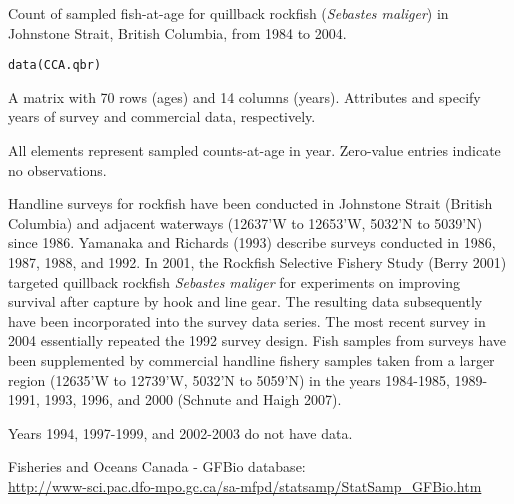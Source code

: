 \documentclass[letterpaper]{book}
\begin{document}
\begin{Description}\relax
Count of sampled fish-at-age for quillback rockfish 
(\emph{Sebastes maliger}) in Johnstone Strait, British Columbia, 
from 1984 to 2004.
\end{Description}
\begin{Usage}
\begin{verbatim}data(CCA.qbr)\end{verbatim}
\end{Usage}
\begin{Format}\relax
A matrix with 70 rows (ages) and 14 columns 
(years). Attributes  and  
specify years of survey and commercial data, respectively.


All elements represent sampled counts-at-age in year. Zero-value
entries indicate no observations.
\end{Format}
\begin{Details}\relax
Handline surveys for rockfish have been conducted in 
Johnstone Strait (British Columbia) and adjacent waterways 
(126\eqn{^\circ}{}37'W to 126\eqn{^\circ}{}53'W, 
50\eqn{^\circ}{}32'N to 50\eqn{^\circ}{}39'N) since 1986. 
Yamanaka and Richards (1993) describe surveys conducted in 1986, 
1987, 1988, and 1992. In 2001, the Rockfish Selective Fishery 
Study (Berry 2001) targeted quillback rockfish \emph{Sebastes 
maliger} for experiments on improving survival after capture  by 
hook and line gear. The resulting data subsequently have been 
incorporated into the survey data series. The most recent survey 
in 2004 essentially repeated the 1992 survey design. Fish samples 
from surveys have been supplemented by commercial handline 
fishery samples taken from a larger region 
(126\eqn{^\circ}{}35'W to 127\eqn{^\circ}{}39'W, 
50\eqn{^\circ}{}32'N to 50\eqn{^\circ}{}59'N) in the years 
1984-1985, 1989-1991, 1993, 1996, and 2000 (Schnute and Haigh 
2007).
\end{Details}
\begin{Note}\relax
Years 1994, 1997-1999, and 2002-2003 do not have data.
\end{Note}
\begin{Source}\relax
Fisheries and Oceans Canada - GFBio database: \\
\url{http://www-sci.pac.dfo-mpo.gc.ca/sa-mfpd/statsamp/StatSamp_GFBio.htm}
\end{Source}
\end{document}
